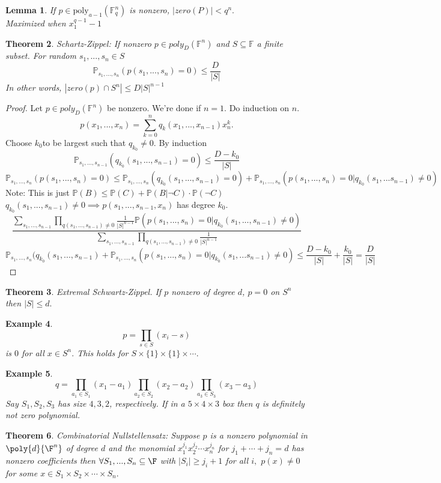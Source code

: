 \documentclass[a4paper]{article}
\newtheorem{thm}{Theorem}[section]
\newtheorem{lem}[thm]{Lemma}
\newtheorem{eg}[thm]{Example}
\begin{document}
\begin{lem}
    If $p\in \text{poly}_{a-1}(\mathbb{F}^n_q)$ is nonzero, $|zero(P)|<q^n.$\\
Maximized when $x_1^{q-1}-1$
\end{lem}
\begin{thm}
    Schartz-Zippel: If nonzero $p\in poly_D(\mathbb{F}^n)$ and $S\subseteq \mathbb{F}$ a finite subset. For random $s_1,...,s_n\in S$ $$\mathbb{P}_{s_1,...,s_n}(p(s_1,...,s_n)=0)\leq \frac{D}{|S|}$$
In other words, $|zero(p)\cap S^n|\leq D|S|^{n-1}$
\end{thm} 
\begin{proof}
    Let $p\in poly_D(\mathbb{F}^n)$ be nonzero. We're done if $n=1$. Do induction on $n.$ $$p(x_1,...,x_n)=\sum_{k=0}^nq_k(x_1,...,x_{n-1})x^k_n.$$ Choose $k_0$to be largest such that $q_{k_0}\neq 0.$ By induction $$\mathbb{P}_{s_1,...,s_{n-1}}(q_{k_0}(s_1,...,s_{n-1})=0)\leq \frac{D-k_0}{|S|}$$
    $$\mathbb{P}_{s_1,...,s_n}(p(s_1,...,s_n)=0)\leq \mathbb{P}_{s_1,...,s_n}(q_{k_0}(s_1,...,s_{n-1})=0)+\mathbb{P}_{s_1,...,s_n}(p(s_1,...,s_n)=0|q_{k_0}(s_1,...s_{n-1})\neq 0)$$
    Note: This is just $\mathbb{P}(B)\leq \mathbb{P}(C)+\mathbb{P}(B|\neg C)\cdot \mathbb{P}(\neg C)$\\
    $q_{k_0}(s_1,...,s_{n-1})\neq 0\implies p(s_1,...,s_{n-1},x_n)$ has degree $k_0.$
    $$\frac{\sum_{s_1,...,s_{n-1}}\prod_{q(s_1,...,s_{n-1})\neq 0}\frac{1}{|S|^{n-1}}\mathbb{P}(p(s_1,...,s_n)=0|q_{k_0}(s_1,...,s_{n-1})\neq 0)}{\sum_{s_1,...,s_{n-1}}\prod_{q(s_1,...,s_{n-1})\neq 0}\frac{1}{|S|^{n-1}}}$$
    $$\mathbb{P}_{s_1,...,s_n}(q_{k_0}(s_1,...,s_{n-1})+\mathbb{P}_{s_1,...,s_n}(p(s_1,...,s_n)=0|q_{k_0}(s_1,...s_{n-1})\neq 0)\leq \frac{D-k_0}{|S|}+\frac{k_0}{|S|}=\frac{D}{|S|}$$
\end{proof}
\begin{thm}
    Extremal Schwartz-Zippel. If $p$ nonzero of degree $d$, $p=0$ on $S^n$ then $|S|\leq d.$
\end{thm}
\begin{eg}
    $$p=\prod_{s\in S}(x_i-s)$$ is $0$ for all $x\in S^n.$ This holds for $S\times \{1\}\times \{1\}\times \cdots.$ 
\end{eg}
\begin{eg}
    $$q=\prod_{a_1\in S_1}(x_1-a_1)\prod _{a_2\in S_2}(x_2-a_2)\prod_{a_3\in S_3}(x_3-a_3)$$
    Say $S_1, S_2,S_3$ has size $4,3,2$, respectively. If in a $5\times4\times3$ box then $q$ is definitely not zero polynomial.
\end{eg}
\begin{thm}
    Combinatorial Nullstellensatz: Suppose $p$ is a nonzero polynomial in $\poly{d}{\F^n}$ of degree $d$ and the monomial $x_1^{j_1}x_2^{j_2}\cdots x_n^{j_n}$ for $j_1+\cdots+j_n=d$ has nonzero coefficients then $\forall S_1,...,S_n\subseteq \F$ with $|S_i|\geq j_i+1$ for all $i,$ $p(x)\neq 0$ for some $x\in S_1\times S_2\times \cdots \times S_n.$
\end{thm}
\end{document}
